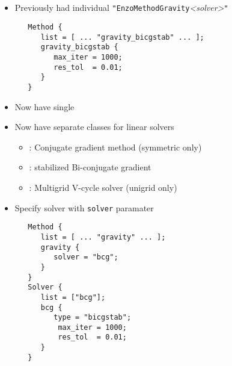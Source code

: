 \NEWSEC


\subsection{\ssRecentGravity}



%  
%
\begin{frame}[fragile,label=ss-recent-solvers] 
  \secframetitle{\ssRecentSolvers}
  \begin{itemize}
  \item Previously had individual \verb+"EnzoMethodGravity+\textit{<solver>}\verb+"+ 
    \begin{verbatim}
   Method {
      list = [ ... "gravity_bicgstab" ... ];
      gravity_bicgstab {
         max_iter = 1000;
         res_tol  = 0.01;
      }
   }
\end{verbatim}
    \vspace{-0.3in}
  \item Now have single  
  \item Now have separate  classes for linear solvers
  \begin{itemize}
    \item {}: Conjugate gradient method (symmetric only)
    \item {}: stabilized Bi-conjugate gradient
    \item {}: Multigrid V-cycle solver (unigrid only)
  \end{itemize}
    \end{itemize}
\end{frame}


\begin{frame}[fragile,label=ss-recent-solvers] 
  \secframetitle{\ssRecentSolvers}
  \begin{itemize}
  \item Specify solver with \verb+solver+ paramater
    \small
     \begin{verbatim}
   Method {
      list = [ ... "gravity" ... ];
      gravity {
         solver = "bcg";
      }
   }
   Solver {
      list = ["bcg"];
      bcg {
         type = "bicgstab";
          max_iter = 1000;
          res_tol  = 0.01;
      }
   }
     \end{verbatim}
%  
%
    \end{itemize}
\end{frame}
%
